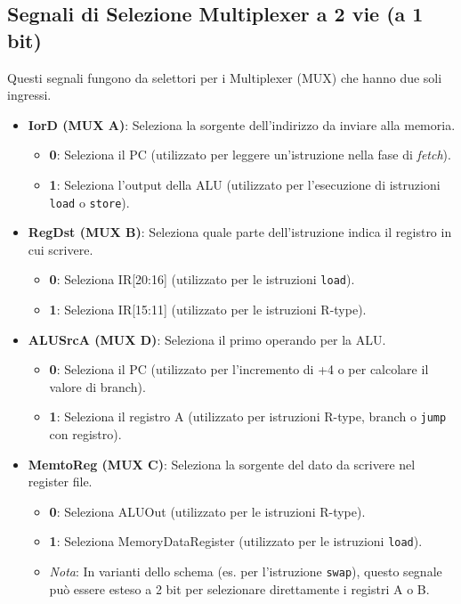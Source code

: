 \subsection{Segnali di Selezione Multiplexer a 2 vie (a 1 bit)}
Questi segnali fungono da selettori per i Multiplexer (MUX) che hanno due soli ingressi.

\begin{itemize}
    \item \textbf{IorD (MUX A)}: Seleziona la sorgente dell'indirizzo da inviare alla memoria.
    \begin{itemize}
        \item \textbf{0}: Seleziona il PC (utilizzato per leggere un'istruzione nella fase di \textit{fetch}).
        \item \textbf{1}: Seleziona l'output della ALU (utilizzato per l'esecuzione di istruzioni \texttt{load} o \texttt{store}).
    \end{itemize}
    \item \textbf{RegDst (MUX B)}: Seleziona quale parte dell'istruzione indica il registro in cui scrivere.
    \begin{itemize}
        \item \textbf{0}: Seleziona IR[20:16] (utilizzato per le istruzioni \texttt{load}).
        \item \textbf{1}: Seleziona IR[15:11] (utilizzato per le istruzioni R-type).
    \end{itemize}
    \item \textbf{ALUSrcA (MUX D)}: Seleziona il primo operando per la ALU.
    \begin{itemize}
        \item \textbf{0}: Seleziona il PC (utilizzato per l'incremento di +4 o per calcolare il valore di branch).
        \item \textbf{1}: Seleziona il registro A (utilizzato per istruzioni R-type, branch o \texttt{jump} con registro).
    \end{itemize}
    \item \textbf{MemtoReg (MUX C)}: Seleziona la sorgente del dato da scrivere nel register file.
    \begin{itemize}
        \item \textbf{0}: Seleziona ALUOut (utilizzato per le istruzioni R-type).
        \item \textbf{1}: Seleziona MemoryDataRegister (utilizzato per le istruzioni \texttt{load}).
        \item \textit{Nota}: In varianti dello schema (es. per l'istruzione \texttt{swap}), questo segnale può essere esteso a 2 bit per selezionare direttamente i registri A o B.
    \end{itemize}
\end{itemize}

